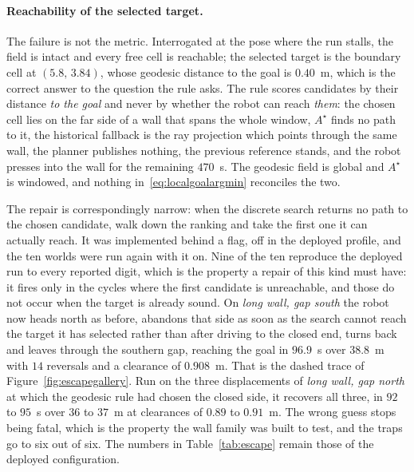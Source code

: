 \documentclass[11pt,a4paper]{article}
\newcommand{\astar}{$A^\star$}
\begin{document}
\paragraph{Reachability of the selected target.} The failure is not the metric. Interrogated at the
pose where the run stalls, the field is intact and every free cell is reachable; the selected target is the
boundary cell at $(5.8,\,3.84)$, whose geodesic distance to the goal is $0.40$~m, which is the correct
answer to the question the rule asks. The rule scores candidates by their distance \emph{to the goal} and
never by whether the robot can reach \emph{them}: the chosen cell lies on the far side of a wall that spans
the whole window, \astar{} finds no path to it, the historical fallback is the ray projection which points
through the same wall, the planner publishes nothing, the previous reference stands, and the robot presses
into the wall for the remaining $470$~s. The geodesic field is global and \astar{} is windowed, and nothing
in~\eqref{eq:localgoalargmin} reconciles the two.

The repair is correspondingly narrow: when the discrete search returns no path to the chosen candidate, walk
down the ranking and take the first one it can actually reach. It was implemented behind a flag, off in the
deployed profile, and the ten worlds were run again with it on. Nine of the ten reproduce the deployed run
to every reported digit, which is the property a repair of this kind must have: it fires only in the cycles
where the first candidate is unreachable, and those do not occur when the target is already sound. On
\emph{long wall, gap south} the robot now heads north as before, abandons that side as soon as the search
cannot reach the target it has selected rather than after driving to the closed end, turns back and leaves
through the southern gap, reaching the goal in $96.9$~s over $38.8$~m with $14$ reversals and a clearance of
$0.908$~m. That is the dashed trace of Figure~\ref{fig:escapegallery}. Run on the three displacements of
\emph{long wall, gap north} at which the geodesic rule had chosen the closed side, it recovers all three, in $92$ to
$95$~s over $36$ to $37$~m at clearances of $0.89$ to $0.91$~m. The wrong guess stops being fatal, which is
the property the wall family was built to test, and the traps go to six out of six. The numbers in
Table~\ref{tab:escape} remain those of the deployed configuration.
\end{document}
